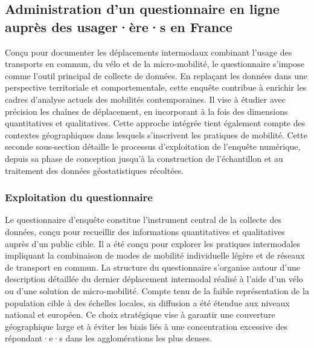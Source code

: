 \begin{refsegment}
\subsection{Administration d'un questionnaire en ligne auprès des usager·ère·s en France
    \label{chap3:administration-questionnaire-usagers}
    }

Conçu pour documenter les déplacements intermodaux combinant l’usage des transports en commun, du vélo et de la micro-mobilité, le questionnaire s’impose comme l’outil principal de collecte de données. En replaçant les données dans une perspective territoriale et comportementale, cette enquête contribue à enrichir les cadres d’analyse actuels des mobilités contemporaines. Il vise à étudier avec précision les chaînes de déplacement, en incorporant à la fois des dimensions quantitatives et qualitatives. Cette approche intégrée tient également compte des contextes géographiques dans lesquels s'inscrivent les pratiques de mobilité. Cette seconde sous-section détaille le processus d’exploitation de l'enquête numérique, depuis sa phase de conception jusqu'à la construction de l'échantillon et au traitement des données géostatistiques récoltées.%

\subsubsection*{Exploitation du questionnaire
    \label{chap3:administration-questionnaire-usagers-exploitation}
    }

Le questionnaire d’enquête constitue l’instrument central de la collecte des données, conçu pour recueillir des informations quantitatives et qualitatives auprès d’un public cible. Il a été conçu pour explorer les pratiques intermodales impliquant la combinaison de modes de mobilité individuelle légère et de réseaux de transport en commun. La structure du questionnaire s’organise autour d’une description détaillée du dernier déplacement intermodal réalisé à l'aide d'un vélo ou d’une solution de micro-mobilité. Compte tenu de la faible représentation de la population cible à des échelles locales, sa diffusion a été étendue aux niveaux national et européen. Ce choix stratégique vise à garantir une couverture géographique large et à éviter les biais liés à une concentration excessive des répondant·e·s dans les agglomérations les plus denses.%


\end{refsegment}
